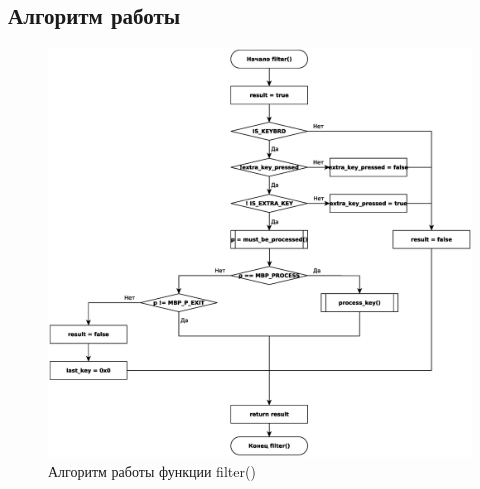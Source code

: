 \subsection{Алгоритм работы}
\begin{figure}[h]
	\centering
	\includegraphics[scale=0.5]{filter.eps}
	\caption*{Алгоритм работы функции filter()}
\end{figure}

